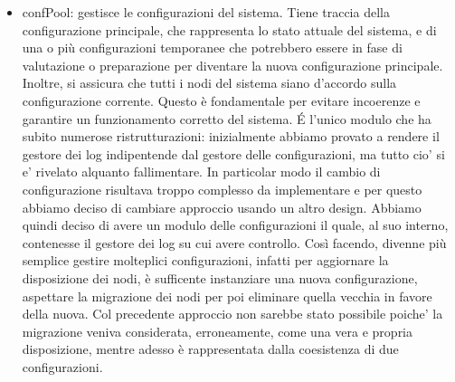 \begin{itemize}
  \item confPool: gestisce le configurazioni del sistema. Tiene traccia della configurazione principale, che rappresenta lo stato attuale del sistema, e di una o più configurazioni temporanee che potrebbero essere in fase di 
    valutazione o preparazione per diventare la nuova configurazione principale. Inoltre, si assicura che tutti i nodi del sistema siano d'accordo sulla configurazione corrente. Questo è fondamentale per evitare 
    incoerenze e garantire un funzionamento corretto del sistema. \'E l'unico modulo che ha subito numerose ristrutturazioni: inizialmente abbiamo provato a rendere il gestore dei log indipentende dal gestore delle configurazioni, 
    ma tutto cio' si e' rivelato alquanto fallimentare. In particolar modo il cambio di configurazione risultava troppo complesso da implementare e per questo abbiamo deciso di cambiare approccio usando un altro design. Abbiamo 
    quindi deciso di avere un modulo delle configurazioni il quale, al suo interno, contenesse il gestore dei log su cui avere controllo. Così facendo, divenne più semplice gestire molteplici configurazioni, infatti per aggiornare
    la disposizione dei nodi, è sufficente instanziare una nuova configurazione, aspettare la migrazione dei nodi per poi eliminare quella vecchia in favore della nuova. 
    Col precedente approccio non sarebbe stato possibile poiche' la migrazione veniva 
    considerata, erroneamente, come una vera e propria disposizione, mentre adesso è rappresentata dalla coesistenza di due configurazioni. 

\end{itemize}




